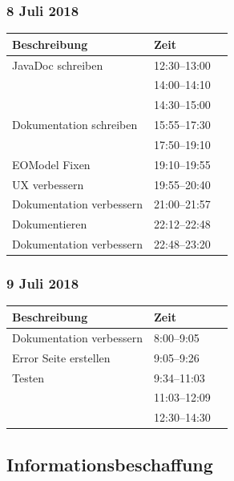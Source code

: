 \documentclass[a4paper, 11pt]{article}
\begin{document}
\subsubsection{8 Juli 2018}

\begin{tabular}{llr}
\toprule
Beschreibung & Zeit \\
\midrule
JavaDoc schreiben & 12:30--13:00 \\
 & 14:00--14:10 \\
 & 14:30--15:00\\
Dokumentation schreiben & 15:55--17:30 \\
 & 17:50--19:10 \\
EOModel Fixen & 19:10--19:55 \\
UX verbessern & 19:55--20:40 \\
Dokumentation verbessern & 21:00--21:57 \\
Dokumentieren & 22:12--22:48 \\
Dokumentation verbessern & 22:48--23:20 \\
\bottomrule
\end{tabular}

\subsubsection{9 Juli 2018}

\begin{tabular}{llr}
\toprule
Beschreibung & Zeit \\
\midrule
Dokumentation verbessern & 8:00--9:05 \\
Error Seite erstellen & 9:05--9:26 \\
Testen & 9:34--11:03 \\
 & 11:03--12:09 \\
 & 12:30--14:30 \\
\bottomrule
\end{tabular}

\subsection{Informationsbeschaffung}
\end{document}
